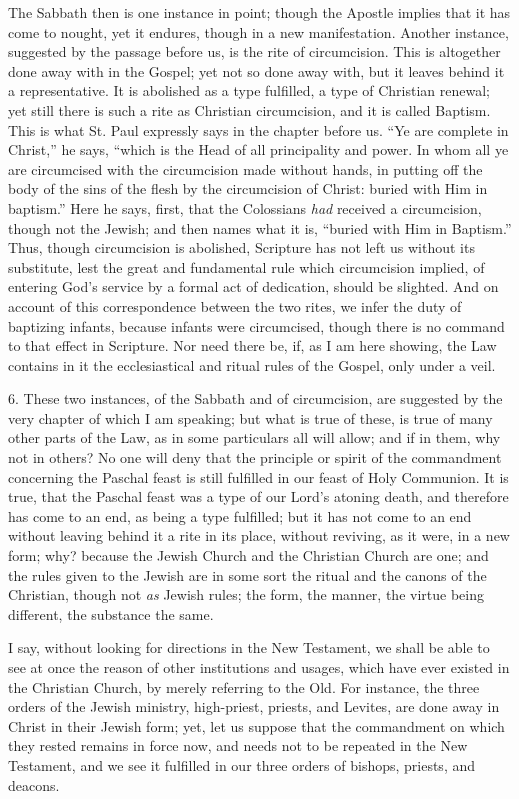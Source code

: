 The Sabbath then is one instance in point; though the Apostle
implies that it has come to nought, yet it endures, though in a new
manifestation. Another instance, suggested by the passage before us,
is the rite of circumcision. This is altogether done away with in the
Gospel; yet not so done away with, but it leaves behind it a
representative. It is abolished as a type fulfilled, a type of
Christian renewal; yet still there is such a rite as Christian
circumcision, and it is called Baptism. This is what St. Paul
expressly says in the chapter before us. ``Ye are complete in
Christ,'' he says, ``which is the Head of all principality and
power. In whom all ye are circumcised with the circumcision made
without hands, in putting off the body of the sins of the flesh by the
circumcision of Christ: buried with Him in baptism.'' Here he
says, first, that the Colossians \emph{had} received a circumcision,
though not the Jewish; and then names what it is, ``buried with
Him in Baptism.'' Thus, though circumcision is abolished,
Scripture has not left us without its substitute, lest the great and
fundamental rule which circumcision implied, of entering God's service
by a formal act of dedication, should be slighted. And on account of
this correspondence between the two rites, we infer the duty of
baptizing infants, because infants were circumcised, though there is
no command to that effect in Scripture. Nor need there be, if, as I am
here showing, the Law contains in it the ecclesiastical and ritual
rules of the Gospel, only under a veil.

6. These two instances, of the Sabbath and of circumcision, are
suggested by the very chapter of which I am speaking; but what is true
of these, is true of many other parts of the Law, as in some
particulars all will allow; and if in them, why not in others? No one
will deny that the principle or spirit of the commandment concerning
the Paschal feast is still fulfilled in our feast of Holy Communion.
It is true, that the Paschal feast was a type of our Lord's atoning
death, and therefore has come to an end, as being a type fulfilled;
but it has not come to an end without leaving behind it a rite in its
place, without reviving, as it were, in a new form; why? because the
Jewish Church and the Christian Church are one; and the rules given to
the Jewish are in some sort the ritual and the canons of the
Christian, though not \emph{as} Jewish rules; the form, the manner, the
virtue being different, the substance the same.

I say, without looking for directions in the New Testament, we
shall be able to see at once the reason of other institutions and
usages, which have ever existed in the Christian Church, by merely
referring to the Old. For instance, the three orders of the Jewish
ministry, high-priest, priests, and Levites, are done away in Christ
in their Jewish form; yet, let us suppose that the commandment on
which they rested remains in force now, and needs not to be repeated
in the New Testament, and we see it fulfilled in our three orders of
bishops, priests, and deacons.

